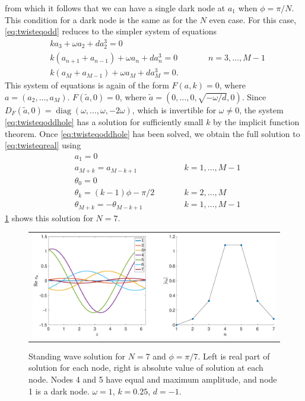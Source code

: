 \documentclass[12pt]{article}
\DeclareMathOperator{\diag}{diag}
\begin{document}
from which it follows that we can have a single dark node at $a_1$ when $\phi = \pi/N$. This condition for a dark node is the same as for the $N$ even case. For this case, \cref{eq:twisteqodd} reduces to the simpler system of equations
\begin{equation}\label{eq:twisteqoddhole}
\begin{aligned}
& k a_3 + \omega a_2 + d a_2^3 = 0\\
&k( a_{n+1} + a_{n-1} ) + \omega a_n + d a_n^3 = 0 && \qquad n = 3, \dots, M-1 \\
&k ( a_M + a_{M-1} ) + \omega a_M + d a_M^3 = 0.
\end{aligned}
\end{equation}
This system of equations is again of the form $F(a,k) = 0$, where $a = (a_2, \dots, a_M)$. $F(\tilde{a}, 0) = 0$, where $\tilde{a} = (0, \dots, 0, \sqrt{-\omega/d}, 0)$. Since $D_F(\tilde{a}, 0) = \diag(\omega, \dots, \omega, -2\omega)$, which is invertible for $\omega \neq 0$, the system \cref{eq:twisteqoddhole} has a solution for sufficiently small $k$ by the implicit function theorem. Once \cref{eq:twisteqoddhole} has been solved, we obtain the full solution to \cref{eq:twisteqreal} using
\begin{align*}
&a_1 = 0 \\
&a_{M+k} = a_{M-k+1} && \qquad k = 1, \dots, M-1 \\
&\theta_0 = 0 \\
&\theta_k = (k-1)\phi - \pi/2 && \qquad k = 2, \dots, M \\
&\theta_{M+k} = -\theta_{M-k+1} && \qquad k = 1, \dots, M-1
\end{align*}
\cref{fig:oddhole7} shows this solution for $N=7$. 
\begin{figure}[H]
\begin{center}
\begin{tabular}{c}
\includegraphics[width=15cm]{images/oddhole7.eps}
\end{tabular}
\end{center}
\caption{Standing wave solution for $N = 7$ and $\phi = \pi/7$. Left is real part of solution for each node, right is absolute value of solution at each node. Nodes 4 and 5 have equal and maximum amplitude, and node 1 is a dark node. $\omega = 1$, $k = 0.25$, $d=-1$.}
\label{fig:oddhole7}
\end{figure}
\end{document}
